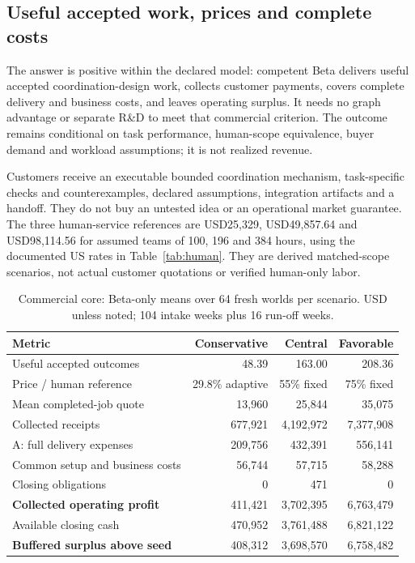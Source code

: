 \subsection{Useful accepted work, prices and complete costs}

The answer is positive within the declared model: competent Beta delivers useful accepted coordination-design work, collects customer payments, covers complete delivery and business costs, and leaves operating surplus. It needs no graph advantage or separate R\&D to meet that commercial criterion. The outcome remains conditional on task performance, human-scope equivalence, buyer demand and workload assumptions; it is not realized revenue.

Customers receive an executable bounded coordination mechanism, task-specific checks and counterexamples, declared assumptions, integration artifacts and a handoff. They do not buy an untested idea or an operational market guarantee. The three human-service references are USD25,329, USD49,857.64 and USD98,114.56 for assumed teams of 100, 196 and 384 hours, using the documented US rates in Table~\ref{tab:human}. They are derived matched-scope scenarios, not actual customer quotations or verified human-only labor.

\begin{table}[H]\centering\small\caption{Commercial core: Beta-only means over 64 fresh worlds per scenario. USD unless noted; 104 intake weeks plus 16 run-off weeks.}\label{tab:commercial}

\begin{tabular}{lrrr}\toprule Metric & Conservative & Central & Favorable\\\midrule

Useful accepted outcomes & 48.39 & 163.00 & 208.36 \\

Price / human reference & 29.8\% adaptive & 55\% fixed & 75\% fixed \\

Mean completed-job quote & 13,960 & 25,844 & 35,075 \\

Collected receipts & 677,921 & 4,192,972 & 7,377,908 \\

A: full delivery expenses & 209,756 & 432,391 & 556,141 \\

Common setup and business costs & 56,744 & 57,715 & 58,288 \\

Closing obligations & 0 & 471 & 0 \\

\textbf{Collected operating profit} & 411,421 & 3,702,395 & 6,763,479 \\

Available closing cash & 470,952 & 3,761,488 & 6,821,122 \\

\textbf{Buffered surplus above seed} & 408,312 & 3,698,570 & 6,758,482 \\

\bottomrule\end{tabular}\end{table}

